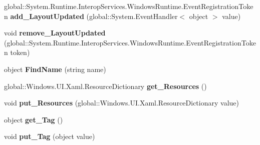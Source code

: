 \begin{DoxyCompactItemize}
\item 
\mbox{\label{interface_windows_1_1_u_i_1_1_xaml_1_1_i_framework_element_a25ade46d3420c73f6b9ca99a333bf905}} 
global\+::\+System.\+Runtime.\+Interop\+Services.\+Windows\+Runtime.\+Event\+Registration\+Token {\bfseries add\+\_\+\+Layout\+Updated} (global\+::\+System.\+Event\+Handler$<$ object $>$ value)
\item 
\mbox{\label{interface_windows_1_1_u_i_1_1_xaml_1_1_i_framework_element_ac054df7c36430442d26d3ce119295117}} 
void {\bfseries remove\+\_\+\+Layout\+Updated} (global\+::\+System.\+Runtime.\+Interop\+Services.\+Windows\+Runtime.\+Event\+Registration\+Token token)
\item 
\mbox{\label{interface_windows_1_1_u_i_1_1_xaml_1_1_i_framework_element_a07a0149f2dee5784c52807f935eb41d9}} 
object {\bfseries Find\+Name} (string name)
\item 
\mbox{\label{interface_windows_1_1_u_i_1_1_xaml_1_1_i_framework_element_aa9da62c1e38c8633cffa0cbd01a78dc6}} 
global\+::\+Windows.\+U\+I.\+Xaml.\+Resource\+Dictionary {\bfseries get\+\_\+\+Resources} ()
\item 
\mbox{\label{interface_windows_1_1_u_i_1_1_xaml_1_1_i_framework_element_ac37b49cdd76f27a64fdecca76f291b5d}} 
void {\bfseries put\+\_\+\+Resources} (global\+::\+Windows.\+U\+I.\+Xaml.\+Resource\+Dictionary value)
\item 
\mbox{\label{interface_windows_1_1_u_i_1_1_xaml_1_1_i_framework_element_a468d4d76ade5b5e14eccf702af30bbf9}} 
object {\bfseries get\+\_\+\+Tag} ()
\item 
\mbox{\label{interface_windows_1_1_u_i_1_1_xaml_1_1_i_framework_element_a946ec4333d28b5f8c9cca42ce9f9eebc}} 
void {\bfseries put\+\_\+\+Tag} (object value)
\item 
\mbox{\label{interface_windows_1_1_u_i_1_1_xaml_1_1_i_framework_element_a19ecd72cbe177cde31aa3674f563854a}} 

\end{DoxyCompactItemize}
